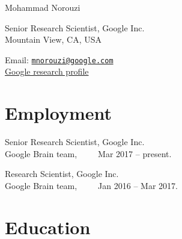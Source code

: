 \documentclass[10pt,letterpaper]{article}
\def\name{Mohammad Norouzi}
\renewenvironment{itemize}{
  \begin{list}{}{
    \setlength{\leftmargin}{1.5em}
  }
}{
  \end{list}
}
\begin{document}
{\huge \name}


\vspace{0.25in}

\begin{minipage}[t]{0.5\textwidth}
  Senior Research Scientist, Google Inc.\\
  Mountain View, CA, USA
\end{minipage}
\begin{minipage}[t]{0.5\textwidth}
  Email: \href{mailto:mnorouzi@google.com}{\tt mnorouzi@google.com} \\
  \href{https://research.google.com/pubs/MohammadNorouzi.html}{Google research profile} \\
\end{minipage}

\section*{Employment}

\begin{itemize}
  \item Senior Research Scientist, Google Inc.\\
    Google Brain team,~~~~~Mar 2017 -- present.
  \item Research Scientist, Google Inc.\\
    Google Brain team,~~~~~Jan 2016 -- Mar 2017.
\end{itemize}

\section*{Education}
\end{document}
